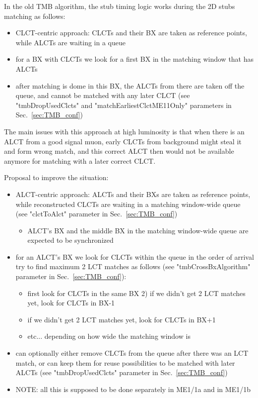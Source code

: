  In the old TMB algorithm, the stub timing logic works during the 2D stubs matching as follows:
\begin{itemize}
    \item CLCT-centric approach: CLCTs and their BX are taken as reference points, while ALCTs are waiting in a queue
    \item for a BX with CLCTs we look for a first BX in the matching window that has ALCTs
    \item after matching is dome in this BX, the ALCTs from there are taken off the queue, and cannot be matched with any later CLCT (see "tmbDropUsedClcts" and "matchEarliestClctME11Only" parameters in Sec.~\ref{sec:TMB_conf})
\end{itemize}

The main issues with this approach at high luminosity is that when there is an ALCT from a good signal muon, early CLCTs from background might steal it and form wrong match, and this correct ALCT then would not be available anymore for matching with a later correct CLCT.

Proposal to improve the situation:
\begin{itemize}
    \item ALCT-centric approach: ALCTs and their BXs are taken as reference points, while reconstructed CLCTs are waiting in a matching window-wide queue (see "clctToAlct" parameter in Sec.~\ref{sec:TMB_conf})
    \begin{itemize}
        \item ALCT's BX and the middle BX in the matching window-wide queue are expected to be synchronized 
    \end{itemize}
    \item for an ALCT's BX we look for CLCTs within the queue in the order of arrival try to find maximum 2 LCT matches as follows (see "tmbCrossBxAlgorithm" parameter in Sec.~\ref{sec:TMB_conf}):
    \begin{itemize}
        \item first look for CLCTs in the same BX 2) if we didn't get 2 LCT matches yet, look for CLCTs in BX-1
        \item if we didn't get 2 LCT matches yet, look for CLCTs in BX+1
        \item etc... depending on how wide the matching window is 
    \end{itemize}
    \item can optionally either remove CLCTs from the queue after there was an LCT match, or can keep them for reuse possibilities to be matched with later ALCTs (see "tmbDropUsedClcts" parameter in Sec.~\ref{sec:TMB_conf})
    \item NOTE: all this is supposed to be done separately in ME1/1a and in ME1/1b 
\end{itemize}

